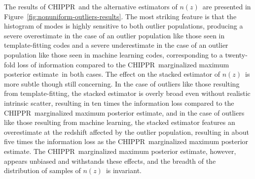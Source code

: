 \documentclass[iop]{emulateapj}
\newcommand{\Fig}[1]{Figure~\ref{#1}}
\newcommand{\project}[1]{\textsc{#1}}
\newcommand{\Chippr}{\project{CHIPPR}}
\newcommand{\nz}{$n(z)$}
\newcommand{\mmle}{marginalized maximum posterior estimate}
\begin{document}
The results of \Chippr\ and the alternative estimators of \nz\ are presented in \Fig{fig:nonuniform-outliers-results}.
The most striking feature is that the histogram of modes is highly sensitive to both outlier populations, producing a severe overestimate in the case of an outlier population like those seen in template-fitting codes and a severe underestimate in the case of an outlier population like those seen in machine learning codes, corresponding to a twenty-fold loss of information compared to the \Chippr\ \mmle\ in both cases.
The effect on the stacked estimator of \nz\ is more subtle though still concerning.
In the case of outliers like those resulting from template-fitting, the stacked estimator is overly broad even without realistic intrinsic scatter, resulting in ten times the information loss compared to the \Chippr\ \mmle, and in the case of outliers like those resulting from machine learning, the stacked estimator features an overestimate at the redshift affected by the outlier population, resulting in about five times the information loss as the \Chippr\ \mmle.
The \Chippr\ \mmle, however, appears unbiased and withstands these effects, and the breadth of the distribution of samples of \nz\ is invariant.
\end{document}
